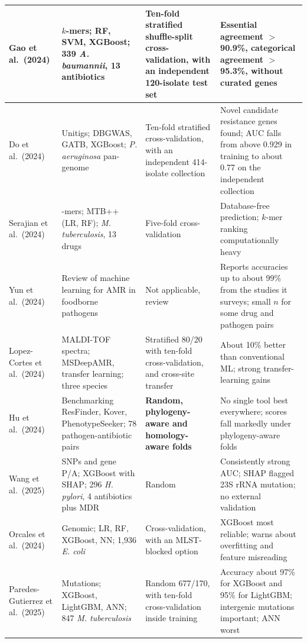 \documentclass[journal]{IEEEtran}
\begin{document}
\begin{table}[!tb]
\begin{tabular}{|>{\raggedright\arraybackslash}p{2.6cm}|>{\raggedright\arraybackslash}p{4.6cm}|>{\raggedright\arraybackslash}p{2.6cm}|>{\raggedright\arraybackslash}p{6.4cm}|}
Gao et al.\ (2024) \cite{Gao2024} & $k$-mers; RF, SVM, XGBoost; 339 \textit{A. baumannii}, 13 antibiotics & Ten-fold stratified shuffle-split cross-validation, with an independent 120-isolate test set & Essential agreement $>$90.9\%, categorical agreement $>$95.3\%, without curated genes \\ \hline
Do et al.\ (2024) \cite{Do2024} & Unitigs; DBGWAS, GATB, XGBoost; \textit{P. aeruginosa} pan-genome & Ten-fold stratified cross-validation, with an independent 414-isolate collection & Novel candidate resistance genes found; AUC falls from above 0.929 in training to about 0.77 on the independent collection \\ \hline
Serajian et al.\ (2024) \cite{serajian2024mtbpp} & 31-mers; MTB++ (LR, RF); \textit{M. tuberculosis}, 13 drugs & Five-fold cross-validation & Database-free prediction; $k$-mer ranking computationally heavy \\ \hline
Yun et al.\ (2024) \cite{Yun2024} & Review of machine learning for AMR in foodborne pathogens & Not applicable, review & Reports accuracies up to about 99\% from the studies it surveys; small $n$ for some drug and pathogen pairs \\ \hline
Lopez-Cortes et al.\ (2024) \cite{LopezCortes2024} & MALDI-TOF spectra; MSDeepAMR, transfer learning; three species & Stratified 80/20 with ten-fold cross-validation, and cross-site transfer & About 10\% better than conventional ML; strong transfer-learning gains \\ \hline
Hu et al.\ (2024) \cite{Hu2024} & Benchmarking ResFinder, Kover, PhenotypeSeeker; 78 pathogen-antibiotic pairs & \textbf{Random, phylogeny-aware and homology-aware folds} & No single tool best everywhere; scores fall markedly under phylogeny-aware folds \\ \hline
Wang et al.\ (2025) \cite{Wang2025} & SNPs and gene P/A; XGBoost with SHAP; 296 \textit{H. pylori}, 4 antibiotics plus MDR & Random & Consistently strong AUC; SHAP flagged 23S rRNA mutation; no external validation \\ \hline
Orcales et al.\ (2024) \cite{Orcales2024} & Genomic; LR, RF, XGBoost, NN; 1,936 \textit{E. coli} & Cross-validation, with an MLST-blocked option & XGBoost most reliable; warns about overfitting and feature misreading \\ \hline
Paredes-Gutierrez et al.\ (2025) \cite{ParedesGutierrez2025} & Mutations; XGBoost, LightGBM, ANN; 847 \textit{M. tuberculosis} & Random 677/170, with ten-fold cross-validation inside training & Accuracy about 97\% for XGBoost and 95\% for LightGBM; intergenic mutations important; ANN worst \\ \hline

\end{tabular}
\end{table}
\end{document}
